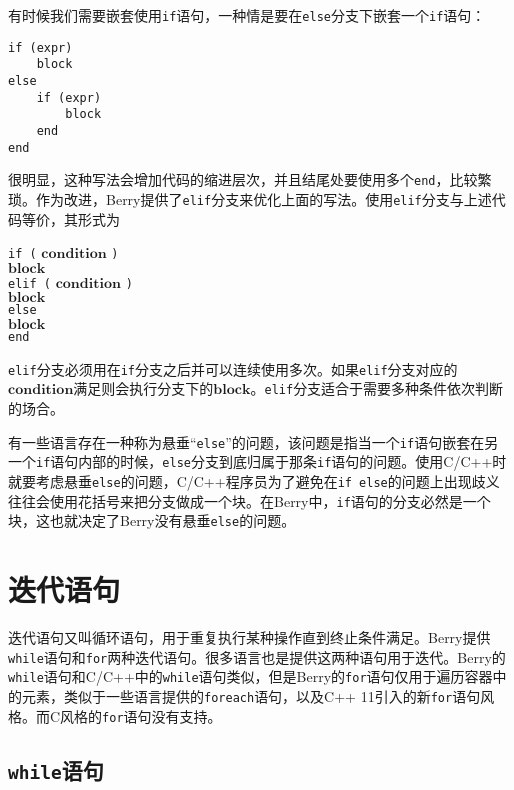 有时候我们需要嵌套使用\texttt{if}语句，一种情是要在\texttt{else}分支下嵌套一个\texttt{if}语句：
\begin{lstlisting}[language=berry, numbers=none]
if (expr)
    block
else
    if (expr)
        block
    end
end
\end{lstlisting}
很明显，这种写法会增加代码的缩进层次，并且结尾处要使用多个\texttt{end}，比较繁琐。作为改进，Berry提供了\texttt{elif}分支来优化上面的写法。使用\texttt{elif}分支与上述代码等价，其形式为
\begin{algorithm}
    \texttt{if (} $\bm{condition}$ \texttt{)} \\
        \qquad $\bm{block}$ \\
    \texttt{elif (} $\bm{condition}$ \texttt{)} \\
        \qquad $\bm{block}$ \\
    \texttt{else} \\
    \qquad $\bm{block}$ \\
    \texttt{end}
\end{algorithm}\vspace{-0.6em}

\texttt{elif}分支必须用在\texttt{if}分支之后并可以连续使用多次。如果\texttt{elif}分支对应的$\bm{condition}$满足则会执行分支下的$\bm{block}$。\texttt{elif}分支适合于需要多种条件依次判断的场合。

有一些语言存在一种称为悬垂``\texttt{else}''的问题，该问题是指当一个\texttt{if}语句嵌套在另一个\texttt{if}语句内部的时候，\texttt{else}分支到底归属于那条\texttt{if}语句的问题。使用C/C++时就要考虑悬垂\texttt{else}的问题，C/C++程序员为了避免在\texttt{if else}的问题上出现歧义往往会使用花括号来把分支做成一个块。在Berry中，\texttt{if}语句的分支必然是一个块，这也就决定了Berry没有悬垂\texttt{else}的问题。

\section{迭代语句}

迭代语句又叫循环语句，用于重复执行某种操作直到终止条件满足。Berry提供\texttt{while}语句和\texttt{for}两种迭代语句。很多语言也是提供这两种语句用于迭代。Berry的\texttt{while}语句和C/C++中的\texttt{while}语句类似，但是Berry的\texttt{for}语句仅用于遍历容器中的元素，类似于一些语言提供的\texttt{foreach}语句，以及C++ 11引入的新\texttt{for}语句风格。而C风格的\texttt{for}语句没有支持。

\subsection{\texttt{while}语句}

